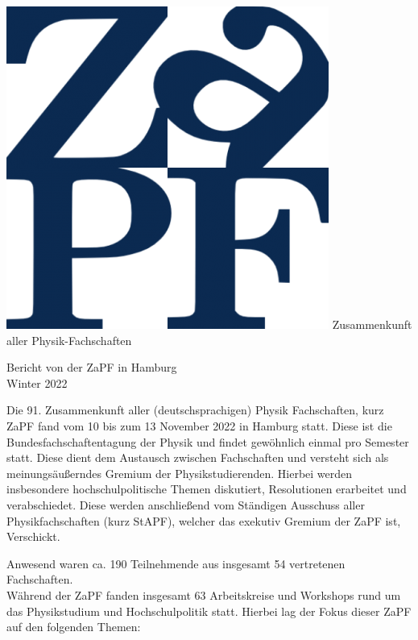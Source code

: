 \documentclass{scrartcl}
\begin{document}
	\hspace{0.74\textwidth}
	\begin{minipage}{0.25\textwidth}
		\vspace{-1cm}
		\centering
		\includegraphics[width=.89\textwidth]{logo.png}
		\small Zusammenkunft aller Physik-Fachschaften
	\end{minipage}
	
	\begin{center}
		\vspace{1.5cm}
		\huge{Bericht von der ZaPF in Hamburg \\ Winter 2022}
		\vspace{1cm}
	\end{center}
	
	Die 91. Zusammenkunft aller (deutschsprachigen) Physik Fachschaften, kurz ZaPF fand vom 10 bis zum 13 November 2022 in Hamburg statt. Diese ist die Bundesfachschaftentagung der Physik und findet gewöhnlich einmal pro Semester statt. Diese dient dem Austausch zwischen Fachschaften und versteht sich als meinungsäußerndes Gremium der Physikstudierenden. Hierbei werden insbesondere hochschulpolitische Themen diskutiert, Resolutionen erarbeitet und verabschiedet. Diese werden anschließend vom Ständigen Ausschuss aller Physikfachschaften (kurz StAPF), welcher das exekutiv Gremium der ZaPF ist, Verschickt.
	
	Anwesend waren ca. 190 Teilnehmende aus insgesamt 54 vertretenen Fachschaften.\\
	Während der ZaPF fanden insgesamt 63 Arbeitskreise und Workshops rund um das Physikstudium und Hochschulpolitik statt. Hierbei lag der Fokus dieser ZaPF auf den folgenden Themen:
	
\end{document}
